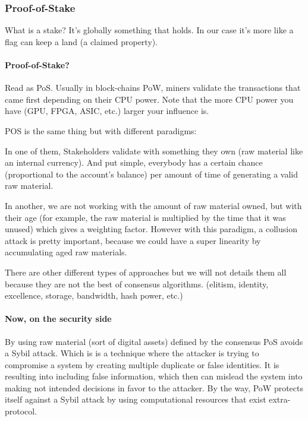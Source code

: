 \subsubsection{Proof-of-Stake}
What is a stake? It's globally something that holds. In our case it's more like a flag can keep a land (a claimed property).

\paragraph{Proof-of-Stake?\cite{King2012PPCoin:Proof-of-Stake}}
Read as PoS. Usually in block-chains PoW, miners validate the transactions that came first depending on their CPU power. Note that the more CPU power you have (GPU, FPGA, ASIC, etc.) larger your influence is.

POS is the same thing but with different paradigms:

In one of them, Stakeholders validate with something they own (raw material like an internal currency). And put simple, everybody has a certain chance (proportional to the account’s balance) per amount of time of generating a valid raw material.

In another, we are not working with the amount of raw material owned, but with their age (for example, the raw material is multiplied by the time that it was unused) which gives a weighting factor. However with this paradigm, a collusion attack is pretty important, because we could have a super linearity by accumulating aged raw materials.

There are other different types of approaches but we will not details them all because they are not the best of consensus algorithms. (elitism, identity, excellence, storage, bandwidth, hash power, etc.)

\paragraph{Now, on the security side} By using raw material (sort of digital assets) defined by the consensus PoS avoids a Sybil\cite{G.LawrencePaulSundararaj1D.R.AnitaSofiaLiz22014Anti-SybilNetworks} attack. Which is is a technique where the attacker is trying to compromise a system by creating multiple duplicate or false identities. It is resulting into including false information, which then can mislead the system into making not intended decisions in favor to the attacker. By the way, PoW protects itself against a Sybil attack by using computational resources that exist extra-protocol.


